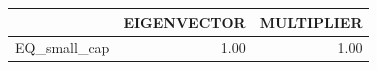 \begin{tabular}{rrr}
  \hline
 & EIGENVECTOR & MULTIPLIER \\ 
  \hline
EQ\_small\_cap & 1.00 & 1.00 \\ 
   \hline
\end{tabular}
